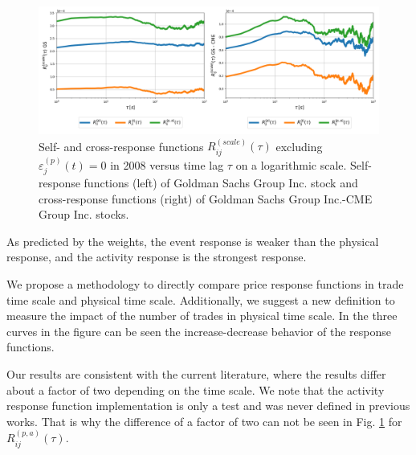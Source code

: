 \begin{figure}[htbp]
    \centering
    \includegraphics[width=\textwidth]
    {figures/03_response_comparison_2008_GSi_CMEj.png}
    \caption{Self- and cross-response functions
             $R^{\left(scale\right)}_{ij}\left(\tau\right)$ excluding
             $\varepsilon^{\left(p\right)}_{j}\left(t\right) = 0$ in 2008
             versus time lag $\tau$ on a logarithmic scale. Self-response
             functions (left) of Goldman Sachs Group Inc. stock and
             cross-response functions (right) of Goldman Sachs Group Inc.-CME
             Group Inc. stocks.}
    \label{fig:relation_responses}
\end{figure}

As predicted by the weights, the event response is weaker than the physical
response, and the activity response is the strongest response.

We propose a methodology to directly compare price response functions in trade
time scale and physical time scale. Additionally, we suggest a new definition
to measure the impact of the number of trades in physical time scale. In the
three curves in the figure can be seen the increase-decrease behavior of the
response functions.

Our results are consistent with the current literature, where the results
differ about a factor of two depending on the time scale. We note that the
activity response function implementation is only a test and was never defined
in previous works. That is why the difference of a factor of two can not be
seen in Fig. \ref{fig:relation_responses} for
$R_{ij}^{\left(p,a\right)} \left( \tau \right)$.

